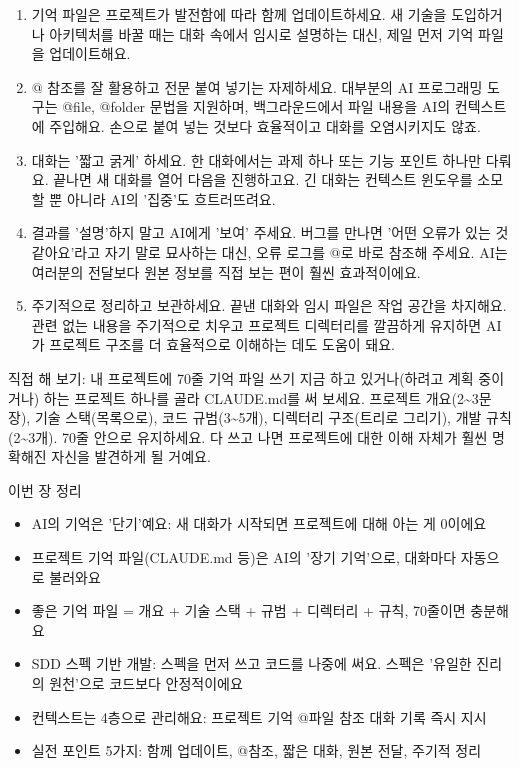 \begin{enumerate}
  \item 기억 파일은 프로젝트가 발전함에 따라 함께 업데이트하세요. 새 기술을 도입하거나 아키텍처를 바꿀 때는 대화 속에서 임시로 설명하는 대신, 제일 먼저 기억 파일을 업데이트해요.
  \item @ 참조를 잘 활용하고 전문 붙여 넣기는 자제하세요. 대부분의 AI 프로그래밍 도구는 @file, @folder 문법을 지원하며, 백그라운드에서 파일 내용을 AI의 컨텍스트에 주입해요. 손으로 붙여 넣는 것보다 효율적이고 대화를 오염시키지도 않죠.
  \item 대화는 '짧고 굵게' 하세요. 한 대화에서는 과제 하나 또는 기능 포인트 하나만 다뤄요. 끝나면 새 대화를 열어 다음을 진행하고요. 긴 대화는 컨텍스트 윈도우를 소모할 뿐 아니라 AI의 '집중'도 흐트러뜨려요.
  \item 결과를 '설명'하지 말고 AI에게 '보여' 주세요. 버그를 만나면 '어떤 오류가 있는 것 같아요'라고 자기 말로 묘사하는 대신, 오류 로그를 @로 바로 참조해 주세요. AI는 여러분의 전달보다 원본 정보를 직접 보는 편이 훨씬 효과적이에요.
  \item 주기적으로 정리하고 보관하세요. 끝낸 대화와 임시 파일은 작업 공간을 차지해요. 관련 없는 내용을 주기적으로 치우고 프로젝트 디렉터리를 깔끔하게 유지하면 AI가 프로젝트 구조를 더 효율적으로 이해하는 데도 도움이 돼요.
\end{enumerate}

\begin{tcbpractice}{직접 해 보기: 내 프로젝트에 70줄 기억 파일 쓰기}
지금 하고 있거나(하려고 계획 중이거나) 하는 프로젝트 하나를 골라 CLAUDE.md를 써 보세요. 프로젝트 개요(2\textasciitilde{}3문장), 기술 스택(목록으로), 코드 규범(3\textasciitilde{}5개), 디렉터리 구조(트리로 그리기), 개발 규칙(2\textasciitilde{}3개). 70줄 안으로 유지하세요. 다 쓰고 나면 프로젝트에 대한 이해 자체가 훨씬 명확해진 자신을 발견하게 될 거예요.

\end{tcbpractice}

\begin{tcbsummary}{이번 장 정리}
\begin{itemize}
  \item AI의 기억은 '단기'예요: 새 대화가 시작되면 프로젝트에 대해 아는 게 0이에요
  \item 프로젝트 기억 파일(CLAUDE.md 등)은 AI의 '장기 기억'으로, 대화마다 자동으로 불러와요
  \item 좋은 기억 파일 = 개요 + 기술 스택 + 규범 + 디렉터리 + 규칙, 70줄이면 충분해요
  \item SDD 스펙 기반 개발: 스펙을 먼저 쓰고 코드를 나중에 써요. 스펙은 '유일한 진리의 원천'으로 코드보다 안정적이에요
  \item 컨텍스트는 4층으로 관리해요: 프로젝트 기억 @파일 참조 대화 기록 즉시 지시
  \item 실전 포인트 5가지: 함께 업데이트, @참조, 짧은 대화, 원본 전달, 주기적 정리
\end{itemize}

\end{tcbsummary}
